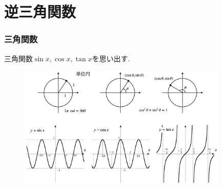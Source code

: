 \documentclass[dvipdfmx,cjk,10.2pt]{beamer}
\theoremstyle{definition}
\begin{document}
%
%
%




\section{逆三角関数}

\begin{frame}
\frametitle{三角関数}

三角関数$\sin x, \cos x, \tan x$を思い出す. 


 \begin{figure}[htbp]
 \begin{center} 
  \includegraphics[width=100mm]{trig2.png}
 \end{center}
\end{figure}


\end{frame}



\end{document}
